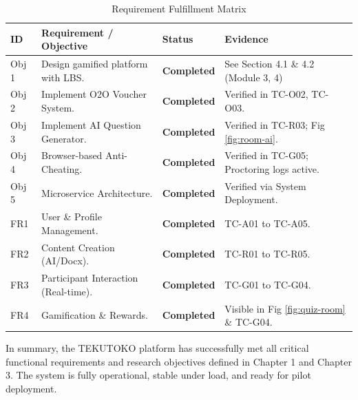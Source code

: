 \begin{table}[htbp]
\centering
\caption{Requirement Fulfillment Matrix}
\label{tab:req-fulfillment}
\begin{tabularx}{\textwidth}{|l|X|l|l|}
\hline
\textbf{ID} & \textbf{Requirement / Objective} & \textbf{Status} & \textbf{Evidence} \\ \hline
Obj 1 & Design gamified platform with LBS. & \textbf{Completed} & See Section 4.1 \& 4.2 (Module 3, 4) \\ \hline
Obj 2 & Implement O2O Voucher System. & \textbf{Completed} & Verified in TC-O02, TC-O03. \\ \hline
Obj 3 & Implement AI Question Generator. & \textbf{Completed} & Verified in TC-R03; Fig \ref{fig:room-ai}. \\ \hline
Obj 4 & Browser-based Anti-Cheating. & \textbf{Completed} & Verified in TC-G05; Proctoring logs active. \\ \hline
Obj 5 & Microservice Architecture. & \textbf{Completed} & Verified via System Deployment. \\ \hline
FR1 & User \& Profile Management. & \textbf{Completed} & TC-A01 to TC-A05. \\ \hline
FR2 & Content Creation (AI/Docx). & \textbf{Completed} & TC-R01 to TC-R05. \\ \hline
FR3 & Participant Interaction (Real-time). & \textbf{Completed} & TC-G01 to TC-G04. \\ \hline
FR4 & Gamification \& Rewards. & \textbf{Completed} & Visible in Fig \ref{fig:quiz-room} \& TC-G04. \\ \hline
\end{tabularx}
\end{table}

In summary, the TEKUTOKO platform has successfully met all critical functional requirements and research objectives defined in Chapter 1 and Chapter 3. The system is fully operational, stable under load, and ready for pilot deployment.
